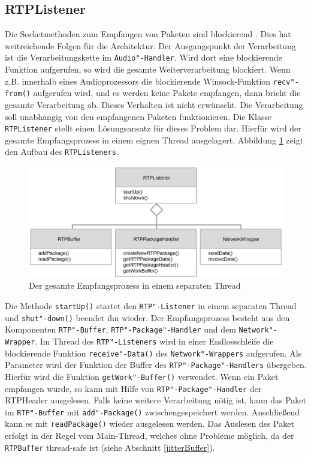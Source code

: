 \subsection{RTPListener}
\label{rtpListener}
Die Socketmethoden zum Empfangen von Paketen sind blockierend \cite{WinsockReference}. Dies hat weitreichende Folgen für die Architektur. Der Ausgangspunkt der Verarbeitung ist die Verarbeitungskette im \texttt{Audio"-Handler}. Wird dort eine blockierende Funktion aufgerufen, so wird die gesamte Weiterverarbeitung blockiert. Wenn z.B. innerhalb eines Audioprozessors die blockierende Winsock-Funktion \texttt{recv"-from()} aufgerufen wird, und es werden keine Pakete empfangen, dann bricht die gesamte Verarbeitung ab. Dieses Verhalten ist nicht erwünscht. Die Verarbeitung soll unabhängig von den empfangenen Paketen funktionieren. Die Klasse \texttt{RTPListener} stellt einen Lösungsansatz für dieses Problem dar. Hierfür wird der gesamte Empfangsprozess in einem eignen Thread ausgelagert. Abbildung \ref{Fig:RTPListenerAdvanced} zeigt den Aufbau des \texttt{RTPListeners}.
\newline
\begin{figure}[htp]
\centering
\includegraphics[width=1\textwidth]{../img/RTPListenerAdvanced}
\caption{Der gesamte Empfangsprozess in einem separaten Thread}
\label{Fig:RTPListenerAdvanced}
\end{figure}

Die Methode \texttt{startUp()} startet den \texttt{RTP"-Listener} in einem separaten Thread und \texttt{shut"-down()} beendet ihn wieder. Der Empfangsprozess besteht aus den Komponenten \texttt{RTP"-Buffer}, \texttt{RTP"-Package"-Handler} und dem \texttt{Network"-Wrapper}. Im Thread des \texttt{RTP"-Listeners} wird in einer Endlosschleife die blockierende Funktion \texttt{receive"-Data()} des \texttt{Network"-Wrappers} aufgerufen. Als Parameter wird der Funktion der Buffer des \texttt{RTP"-Package"-Handlers} übergeben. Hierfür wird die Funktion \texttt{getWork"-Buffer()} verwendet. Wenn ein Paket empfangen wurde, so kann mit Hilfe von \texttt{RTP"-Package"-Handler} der RTPHeader ausgelesen. Falls keine weitere Verarbeitung nötig ist, kann das Paket im \texttt{RTP"-Buffer} mit \texttt{add"-Package()} zwischengespeichert werden. Anschließend kann es mit \texttt{readPackage()} wieder ausgelesen werden. Das Auslesen des Paket erfolgt in der Regel vom Main-Thread, welches ohne Probleme möglich, da der \texttt{RTPBuffer} thread-safe ist (siehe Abschnitt \ref{jitterBuffer}).

